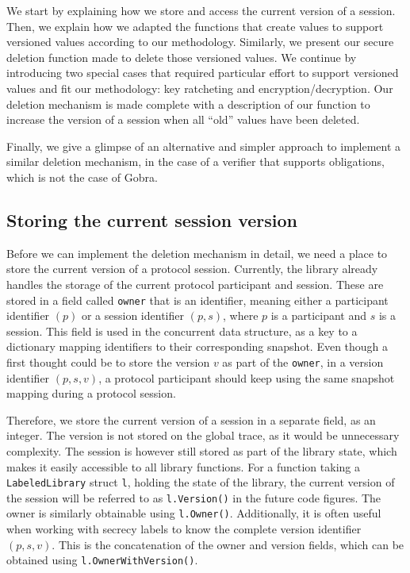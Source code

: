 We start by explaining how we store and access the current version of a session.
Then, we explain how we adapted the functions that create values to support versioned values according to our methodology.
Similarly, we present our secure deletion function made to delete those versioned values.
We continue by introducing two special cases that required particular effort to support versioned values and fit our methodology: key ratcheting and encryption/decryption. 
Our deletion mechanism is made complete with a description of our function to increase the version of a session when all “old” values have been deleted.

Finally, we give a glimpse of an alternative and simpler approach to implement a similar deletion mechanism, in the case of a verifier that supports obligations, which is not the case of Gobra. 

\subsection{Storing the current session version}
\label{sec:storing-the-current-session-version}

Before we can implement the deletion mechanism in detail, we need a place to store the current version of a protocol session.
Currently, the library already handles the storage of the current protocol participant and session.
These are stored in a field called \texttt{owner} that is an identifier, meaning either a participant identifier $(p)$ or a session identifier $(p,s)$, where $p$ is a participant and $s$ is a session.
This field is used in the concurrent data structure, as a key to a dictionary mapping identifiers to their corresponding snapshot.
Even though a first thought could be to store the version $v$ as part of the \texttt{owner}, in a version identifier $(p,s,v)$, a protocol participant should keep using the same snapshot mapping during a protocol session.

Therefore, we store the current version of a session in a separate field, as an integer.
The version is not stored on the global trace, as it would be unnecessary complexity.
The session is however still stored as part of the library state, which makes it easily accessible to all library functions.
For a function taking a \texttt{LabeledLibrary} struct \texttt{l}, holding the state of the library, the current version of the session will be referred to as \texttt{l.Version()} in the future code figures.
The owner is similarly obtainable using \texttt{l.Owner()}.
Additionally, it is often useful when working with secrecy labels to know the complete version identifier $(p,s,v)$. This is the concatenation of the owner and version fields, which can be obtained using \texttt{l.OwnerWithVersion()}.

